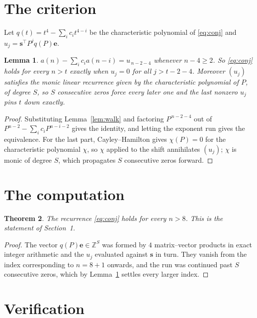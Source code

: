 \documentclass[11pt,a4paper]{article}
\theoremstyle{plain}
\newtheorem{theorem}{Theorem}
\newtheorem{lemma}[theorem]{Lemma}
\theoremstyle{definition}
\begin{document}
\section{The criterion}

Let $q(t)=t^{4}-\sum_i c_i t^{4-i}$ be the characteristic polynomial of
\eqref{eq:conj} and $u_j=\mathbf{s}^{\!\top}P^{j}q(P)\mathbf{e}$.

\begin{lemma}\label{lem:crit}
$a(n)-\sum_i c_i a(n-i)=u_{\,n-2-4}$ whenever $n-4\ge2$. So \eqref{eq:conj}
holds for every $n>t$ exactly when $u_j=0$ for all $j>t-2-4$. Moreover $(u_j)$
satisfies the monic linear recurrence given by the characteristic polynomial of $P$, of
degree $S$, so $S$ consecutive zeros force every later one and the last nonzero $u_j$ pins
$t$ down exactly.
\end{lemma}

\begin{proof}
Substituting Lemma~\ref{lem:walk} and factoring $P^{\,n-2-4}$ out of
$P^{n-2}-\sum_i c_i P^{n-i-2}$ gives the identity, and letting the exponent run gives the
equivalence. For the last part, Cayley--Hamilton gives $\chi(P)=0$ for the characteristic
polynomial $\chi$, so $\chi$ applied to the shift annihilates $(u_j)$; $\chi$ is monic of
degree $S$, which propagates $S$ consecutive zeros forward.
\end{proof}

\section{The computation}

\begin{theorem}
The recurrence \eqref{eq:conj} holds for every $n>8$. This is the statement of
Section~1.
\end{theorem}

\begin{proof}
The vector $q(P)\mathbf{e}\in\mathbb{Z}^{S}$ was formed by $4$ matrix--vector
products in exact integer arithmetic and the $u_j$ evaluated against $\mathbf{s}$ in turn.
They vanish from the index corresponding to $n=8+1$ onwards, and the run was continued
past $S$ consecutive zeros, which by Lemma~\ref{lem:crit} settles every larger index.
\end{proof}

\section{Verification}
\end{document}
